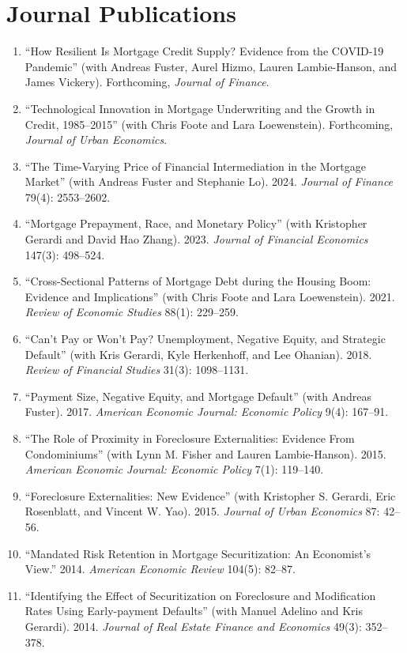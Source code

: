 \documentclass[11pt]{article}
\begin{document}
\section*{Journal Publications}
\begin{enumerate}[leftmargin=*, nosep]
\item ``How Resilient Is Mortgage Credit Supply? Evidence from the COVID-19 Pandemic'' (with Andreas Fuster, Aurel Hizmo, Lauren Lambie-Hanson, and James Vickery). Forthcoming, \textit{Journal of Finance}.
\item ``Technological Innovation in Mortgage Underwriting and the Growth in Credit, 1985--2015'' (with Chris Foote and Lara Loewenstein). Forthcoming, \textit{Journal of Urban Economics}.
\item ``The Time-Varying Price of Financial Intermediation in the Mortgage Market'' (with Andreas Fuster and Stephanie Lo). 2024. \textit{Journal of Finance} 79(4): 2553--2602.
\item ``Mortgage Prepayment, Race, and Monetary Policy'' (with Kristopher Gerardi and David Hao Zhang). 2023. \textit{Journal of Financial Economics} 147(3): 498--524.
\item ``Cross-Sectional Patterns of Mortgage Debt during the Housing Boom: Evidence and Implications'' (with Chris Foote and Lara Loewenstein). 2021. \textit{Review of Economic Studies} 88(1): 229--259.
\item ``Can't Pay or Won't Pay? Unemployment, Negative Equity, and Strategic Default'' (with Kris Gerardi, Kyle Herkenhoff, and Lee Ohanian). 2018. \textit{Review of Financial Studies} 31(3): 1098--1131.
\item ``Payment Size, Negative Equity, and Mortgage Default'' (with Andreas Fuster). 2017. \textit{American Economic Journal: Economic Policy} 9(4): 167--91.
\item ``The Role of Proximity in Foreclosure Externalities: Evidence From Condominiums'' (with Lynn M. Fisher and Lauren Lambie-Hanson). 2015. \textit{American Economic Journal: Economic Policy} 7(1): 119--140.
\item ``Foreclosure Externalities: New Evidence'' (with Kristopher S. Gerardi, Eric Rosenblatt, and Vincent W. Yao). 2015. \textit{Journal of Urban Economics} 87: 42--56.
\item ``Mandated Risk Retention in Mortgage Securitization: An Economist's View.'' 2014. \textit{American Economic Review} 104(5): 82--87.
\item ``Identifying the Effect of Securitization on Foreclosure and Modification Rates Using Early-payment Defaults'' (with Manuel Adelino and Kris Gerardi). 2014. \textit{Journal of Real Estate Finance and Economics} 49(3): 352--378.

\end{enumerate}
\end{document}
